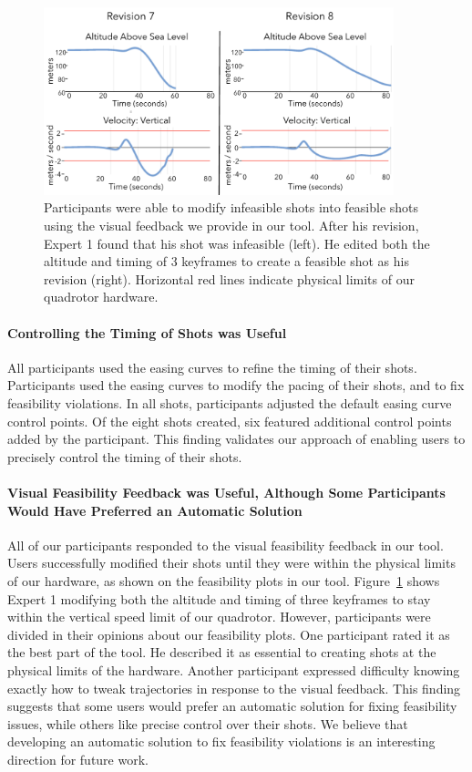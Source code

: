 \begin{figure}[t]
\centering
\includegraphics[width=4.0in]{images/2015_siggraph_asia/edit-infeasible.pdf}
\caption{
Participants were able to modify infeasible shots into feasible shots using the visual feedback we provide in our tool.
After his  revision, Expert 1 found that his shot was infeasible (left).
He edited both the altitude and timing of 3 keyframes to create a feasible shot as his  revision (right).
Horizontal red lines indicate physical limits of our quadrotor hardware.
}
\label{fig:ch2:feasibility_fix}
\end{figure}

\paragraph{Controlling the Timing of Shots was Useful}
All participants used the easing curves to refine the timing of their shots.
Participants used the easing curves to modify the pacing of their shots, and to fix feasibility violations.
In all shots, participants adjusted the default easing curve control points.
Of the eight shots created, six featured additional control points added by the participant.
This finding validates our approach of enabling users to precisely control the timing of their shots.

\paragraph{Visual Feasibility Feedback was Useful, Although Some Participants Would Have Preferred an Automatic Solution}
All of our participants responded to the visual feasibility feedback in our tool.
Users successfully modified their shots until they were within the physical limits of our hardware, as shown on the feasibility plots in our tool.
Figure~\ref{fig:ch2:feasibility_fix} shows Expert 1 modifying both the altitude and timing of three keyframes to stay within the vertical speed limit of our quadrotor.
However, participants were divided in their opinions about our feasibility plots.
One participant rated it as the best part of the tool.
He described it as essential to creating shots at the physical limits of the hardware.
Another participant expressed difficulty knowing exactly how to tweak trajectories in response to the visual feedback.
This finding suggests that some users would prefer an automatic solution for fixing feasibility issues, while others like precise control over their shots.
We believe that developing an automatic solution to fix feasibility violations is an interesting direction for future work.

